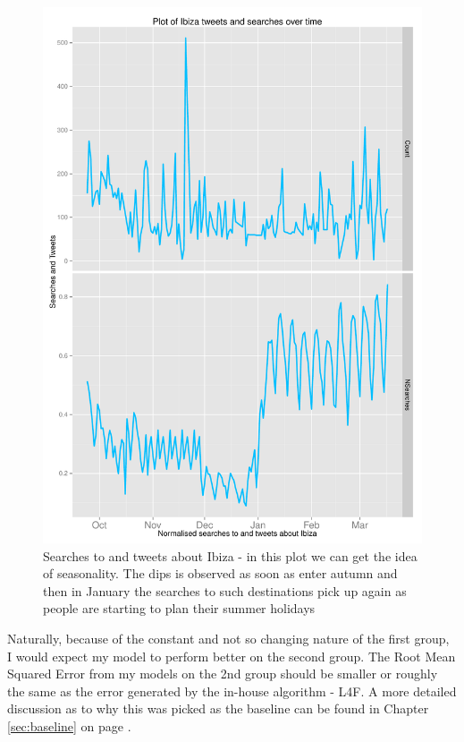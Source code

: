 \documentclass[minf,twoside,singlespacing,parskip,frontabs]{infthesis}
\begin{document}
\begin{figure}[]
\begin{center}
\includegraphics[scale=0.7]{ibiza-searches}
\end{center}
\caption{Searches to and tweets about Ibiza - in this plot we can get the idea of seasonality. The dips is observed as soon as enter autumn and then in January the searches to such destinations pick up again as people are starting to plan their summer holidays}
\label{ibiza-searches}
\end{figure}

Naturally, because of the constant and not so changing nature of the first group, I would expect my model to perform better on the second group. The Root Mean Squared Error from my models on the 2nd group should be smaller or roughly the same as the error generated by the in-house algorithm - L4F. A more detailed discussion as to why this was picked as the baseline can be found in Chapter \ref{sec:baseline} on page \pageref{sec:baseline}.
\end{document}
